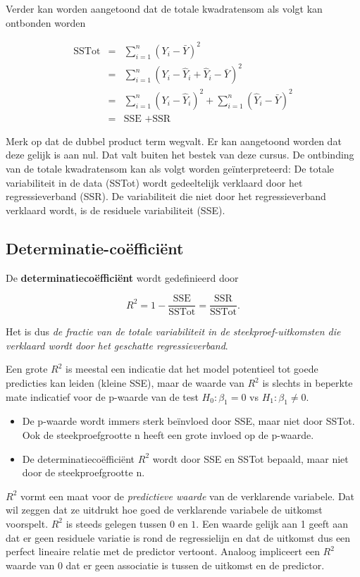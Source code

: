 \documentclass[
  12pt,dutch]{book}
\providecommand{\tightlist}{%
  \setlength{\itemsep}{0pt}\setlength{\parskip}{0pt}}
\theoremstyle{definition}
\theoremstyle{definition}
\theoremstyle{definition}
\theoremstyle{definition}
\theoremstyle{remark}
\begin{document}
Verder kan worden aangetoond dat de totale kwadratensom als volgt kan ontbonden worden

\begin{eqnarray*}
  \text{SSTot}
    &=&  \sum_{i=1}^n (Y_i-\bar{Y})^2 \\
    &=&  \sum_{i=1}^n (Y_i-\hat{Y}_i+\hat{Y}_i-\bar{Y})^2 \\
    &=&  \sum_{i=1}^n (Y_i-\hat{Y}_i)^2+\sum_{i=1}^n(\hat{Y}_i-\bar{Y})^2 \\
    &=&  \text{SSE }+\text{SSR}  
\end{eqnarray*}

Merk op dat de dubbel product term wegvalt. Er kan aangetoond worden dat deze gelijk is aan nul. Dat valt buiten het bestek van deze cursus.
De ontbinding van de totale kwadratensom kan als volgt worden geïnterpreteerd:
De totale variabiliteit in de data (SSTot) wordt gedeeltelijk verklaard door het regressieverband (SSR). De variabiliteit die niet door het regressieverband verklaard wordt, is de residuele variabiliteit (SSE).

\subsection{Determinatie-coëfficiënt}\label{determinatie-couxebfficiuxebnt}

De \textbf{determinatiecoëfficiënt} wordt gedefinieerd door

\[ R^2 = 1-\frac{\text{SSE}}{\text{SSTot}}=\frac{\text{SSR}}{\text{SSTot}}.\]

Het is dus \emph{de fractie van de totale variabiliteit in de steekproef-uitkomsten die verklaard wordt door het geschatte regressieverband}.

Een grote \(R^2\) is meestal een indicatie dat het model potentieel tot goede predicties kan leiden (kleine SSE), maar de waarde van \(R^2\) is slechts in beperkte mate indicatief voor de p-waarde van de test \(H_0:\beta_1=0\) vs \(H_1:\beta_1\neq0\).

\begin{itemize}
\tightlist
\item
  De p-waarde wordt immers sterk beïnvloed door SSE, maar niet door SSTot. Ook de steekproefgrootte n heeft een grote invloed op de p-waarde.
\item
  De determinatiecoëfficiënt \(R^2\) wordt door SSE en SSTot bepaald, maar niet door de steekproefgrootte n.
\end{itemize}

\(R^2\) vormt een maat voor de \emph{predictieve waarde} van de verklarende variabele.
Dat wil zeggen dat ze uitdrukt hoe goed de verklarende variabele de uitkomst voorspelt.
\(R^2\) is steeds gelegen tussen \(0\) en \(1\). Een waarde gelijk aan 1 geeft aan dat er geen residuele variatie is rond de regressielijn en dat de
uitkomst dus een perfect lineaire relatie met de predictor vertoont. Analoog impliceert een \(R^2\) waarde van 0 dat er geen associatie is tussen de uitkomst en de predictor.
\end{document}
